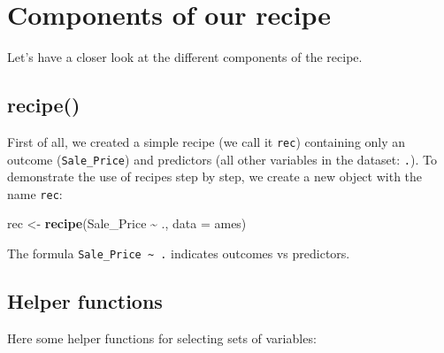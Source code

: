 \documentclass[
]{book}
\newenvironment{Shaded}{\begin{snugshade}}{\end{snugshade}}
\newcommand{\DataTypeTok}[1]{\textcolor[rgb]{0.13,0.29,0.53}{#1}}
\newcommand{\KeywordTok}[1]{\textcolor[rgb]{0.13,0.29,0.53}{\textbf{#1}}}
\newcommand{\NormalTok}[1]{#1}
\newcommand{\OperatorTok}[1]{\textcolor[rgb]{0.81,0.36,0.00}{\textbf{#1}}}
\newcommand{\StringTok}[1]{\textcolor[rgb]{0.31,0.60,0.02}{#1}}
\begin{document}
\begin{Shaded}
\end{Shaded}

\hypertarget{components-of-our-recipe}{%
\chapter{Components of our recipe}\label{components-of-our-recipe}}

Let's have a closer look at the different components of the recipe.

\hypertarget{recipe-2}{%
\section{recipe()}\label{recipe-2}}

First of all, we created a simple recipe (we call it \texttt{rec}) containing only an outcome (\texttt{Sale\_Price}) and predictors (all other variables in the dataset: \texttt{.}). To demonstrate the use of recipes step by step, we create a new object with the name \texttt{rec}:

\begin{Shaded}
\begin{Highlighting}[]
\NormalTok{rec \textless{}{-}}\StringTok{ }\KeywordTok{recipe}\NormalTok{(Sale\_Price }\OperatorTok{\textasciitilde{}}\StringTok{ }\NormalTok{., }\DataTypeTok{data =}\NormalTok{ ames)}
\end{Highlighting}
\end{Shaded}

The formula \texttt{Sale\_Price\ \textasciitilde{}\ .} indicates outcomes vs predictors.

\hypertarget{helper-functions}{%
\section{Helper functions}\label{helper-functions}}

Here some helper functions for selecting sets of variables:
\end{document}
